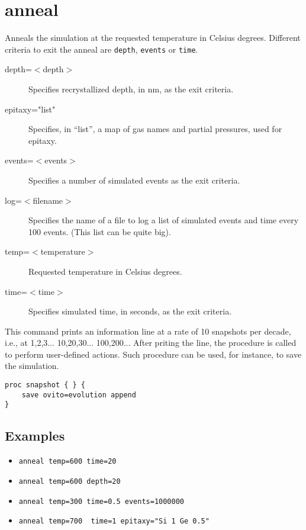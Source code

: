 \section{anneal}

Anneals the simulation at the requested temperature in Celsius degrees. Different criteria to exit the anneal are {\tt depth}, {\tt events} or {\tt time}.

\begin{description}
\item [depth=$<$depth$>$] Specifies recrystallized depth, in nm, as the exit criteria.
\item [epitaxy="list"] Specifies, in ``list'', a map of gas names and partial pressures, used for epitaxy.
\item [events=$<$events$>$] Specifies a number of simulated events as the exit criteria.
\item [log=$<$filename$>$] Specifies the name of a file to log a list of simulated events and time every 100 events. (This list can be quite big).
\item [temp=$<$temperature$>$] Requested temperature in Celsius degrees.
\item [time=$<$time$>$] Specifies simulated time, in seconds, as the exit criteria.
\end{description}

This command prints an information line at a rate of 10 snapshots per decade, i.e., at 1,2,3... 10,20,30... 100,200... After priting the line, the procedure   is called to perform user-defined actions. Such procedure can be used, for instance, to save the simulation.

\begin{lstlisting}
proc snapshot { } {
	save ovito=evolution append
}
\end{lstlisting}

\subsection{Examples}
\begin{itemize}
\item \verb+anneal temp=600 time=20+
\item \verb+anneal temp=600 depth=20+
\item \verb+anneal temp=300 time=0.5 events=1000000+
\item \verb+anneal temp=700  time=1 epitaxy="Si 1 Ge 0.5"+
\end{itemize}
